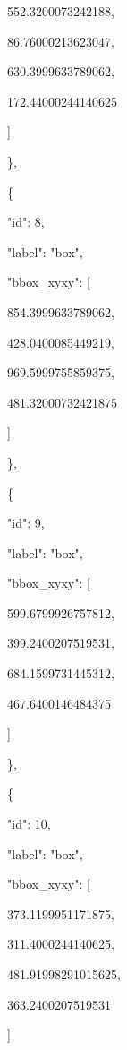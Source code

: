 \documentclass[10pt,a4paper]{article}
\begin{document}
        552.3200073242188,\allowbreak{}\par
        86.76000213623047,\allowbreak{}\par
        630.3999633789062,\allowbreak{}\par
        172.44000244140625\par
      ]\par
    \},\allowbreak{}\par
    \{\par
      "id":\allowbreak{} 8,\allowbreak{}\par
      "label":\allowbreak{} "box",\allowbreak{}\par
      "bbox\_xyxy":\allowbreak{} [\par
        854.3999633789062,\allowbreak{}\par
        428.0400085449219,\allowbreak{}\par
        969.5999755859375,\allowbreak{}\par
        481.32000732421875\par
      ]\par
    \},\allowbreak{}\par
    \{\par
      "id":\allowbreak{} 9,\allowbreak{}\par
      "label":\allowbreak{} "box",\allowbreak{}\par
      "bbox\_xyxy":\allowbreak{} [\par
        599.6799926757812,\allowbreak{}\par
        399.2400207519531,\allowbreak{}\par
        684.1599731445312,\allowbreak{}\par
        467.6400146484375\par
      ]\par
    \},\allowbreak{}\par
    \{\par
      "id":\allowbreak{} 10,\allowbreak{}\par
      "label":\allowbreak{} "box",\allowbreak{}\par
      "bbox\_xyxy":\allowbreak{} [\par
        373.1199951171875,\allowbreak{}\par
        311.4000244140625,\allowbreak{}\par
        481.91998291015625,\allowbreak{}\par
        363.2400207519531\par
      ]\par
\end{document}
